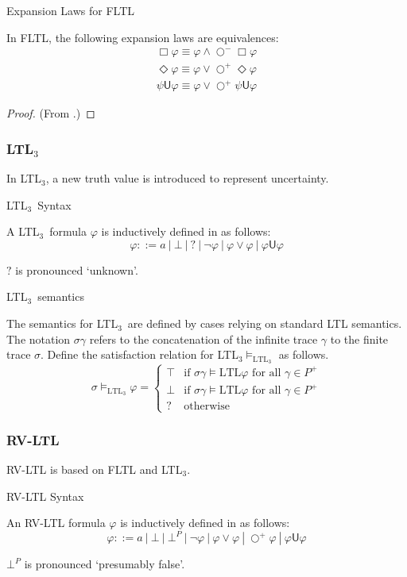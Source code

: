 \documentclass[a4paper]{article}
\newcommand{\U}{\mathsf{U}}
\newcommand{\fall}{\text{ for all }}
\newcommand{\sn}{\bigcirc^+}
\newcommand{\wn}{\bigcirc^-}
\newcommand{\ltlt}{LTL$_3$}
\begin{document}
\begin{lem}{Expansion Laws for FLTL}\label{fltlexp}

  In FLTL, the following expansion laws are equivalences:
  \begin{align}
    \Box \varphi \equiv \varphi \land \wn \Box \varphi \label{felBox}\\
    \Diamond \varphi \equiv \varphi \lor \sn \Diamond \varphi\label{felDiamond}\\
    \psi \U \varphi \equiv \varphi \lor \sn \psi \U \varphi\label{felU}
  \end{align}

\end{lem}

\begin{proof}
  (From \autocite{bauer2010comparing}.)
\end{proof}

\subsubsection{\ltlt} In \ltlt, a new truth value is introduced to represent uncertainty.

\begin{defn}{\ltlt\ Syntax}

  A \ltlt\ formula $\varphi$ is inductively defined in as follows:
  \[\varphi ::= a ~|~ \bot ~|~ ? ~|~ \neg \varphi ~|~\varphi \lor \varphi ~|~ \varphi \U\varphi\]

  $?$ is pronounced `unknown'.
\end{defn}
\begin{defn}{\ltlt\ semantics}

  The semantics for \ltlt\ are defined by cases relying on standard LTL semantics. The notation $\sigma\gamma$ refers to the concatenation of the infinite trace $\gamma$ to the finite trace $\sigma$.
  Define the satisfaction relation for \ltlt $\vDash_{\text{\ltlt}}$ as follows.
  \[\sigma\vDash_{\text{\ltlt}}\varphi =
    \begin{cases}
      \top & \text{if } \sigma\gamma \vDash{\text{LTL}} \varphi \fall \gamma \in P^+\\
      \bot & \text{if } \sigma\gamma \vDash{\text{LTL}} \varphi \fall \gamma \in P^+\\
      ? & \text{otherwise}
    \end{cases}
    \]
\end{defn}

\subsubsection{RV-LTL} RV-LTL is based on FLTL and \ltlt.
\begin{defn}{RV-LTL Syntax}

  An RV-LTL formula $\varphi$ is inductively defined in as follows:
  \[\varphi ::= a ~|~ \bot ~|~ \bot^P ~|~ \neg \varphi ~|~\varphi \lor \varphi ~|~ \sn \varphi ~|~ \varphi \U\varphi\]

  $\bot^P$ is pronounced `presumably false'.
\end{defn}
\end{document}
